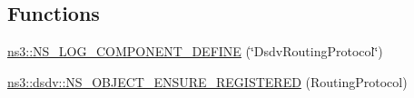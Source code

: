 \subsection*{Functions}
\begin{DoxyCompactItemize}
\item 
\hyperlink{namespacens3_a95b9945e20e45bf1a1853470ad073744}{ns3\+::\+N\+S\+\_\+\+L\+O\+G\+\_\+\+C\+O\+M\+P\+O\+N\+E\+N\+T\+\_\+\+D\+E\+F\+I\+NE} (\char`\"{}Dsdv\+Routing\+Protocol\char`\"{})
\item 
\hyperlink{namespacens3_1_1dsdv_af3d57a6a6a855a705053538a68c9f2c7}{ns3\+::dsdv\+::\+N\+S\+\_\+\+O\+B\+J\+E\+C\+T\+\_\+\+E\+N\+S\+U\+R\+E\+\_\+\+R\+E\+G\+I\+S\+T\+E\+R\+ED} (Routing\+Protocol)
\end{DoxyCompactItemize}
